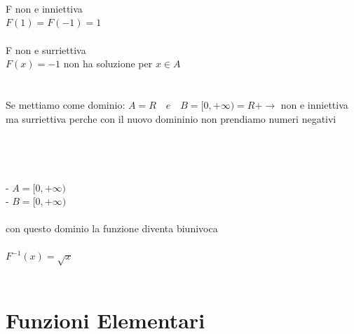 \documentclass{article}
\begin{document}
\\
\\
\\
F non e inniettiva\\
$F(1)=F(-1)=1$\\
\\
F non e surriettiva\\
$F(x)=-1$ non ha soluzione per $x \in A$\\
\\
\\
Se mettiamo come dominio: $A=R \quad e \quad B=[0,+ \infty) =R+ \to$ non e inniettiva ma surriettiva perche con il nuovo domininio non prendiamo numeri negativi\\
\\
\\
\\
\\
- $A=[0,+ \infty)$\\
- $B=[0,+ \infty)$\\
\\
con questo dominio la funzione diventa biunivoca\\
\\
$F^{-1}(x)=\sqrt x$
\\
\\
\section{Funzioni Elementari}
\end{document}
